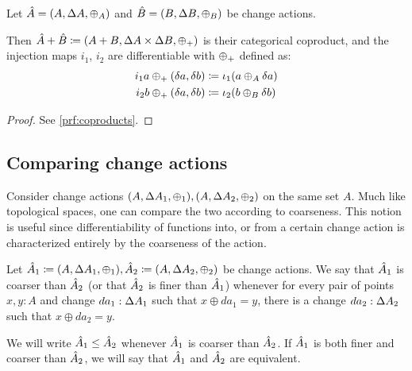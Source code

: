 \begin{prop}[name=Coproducts, restate=coproducts]
  \label{prop:coproducts}
  Let $\hat{A} = (A,\Delta A,\oplus_A)$ and $\hat{B} =
  (B,\Delta B,\oplus_B)$ be change actions.

  Then $\hat{A} + \hat{B} \coloneqq (A + B,\Delta A \times
  \Delta B,\oplus_{+})$ is their categorical coproduct, and the injection
maps $i_1$, $i_2$ are differentiable with $\oplus_{+}$ defined as:
  \begin{align*}
    i_1 a \oplus_{+} (\delta a, \delta b) &\coloneqq \iota_1 (a \oplus_A \delta a)\\
    i_2 b \oplus_{+} (\delta a, \delta b) &\coloneqq \iota_2 (b \oplus_B \delta b)
  \end{align*}
\end{prop}
\ifproofs
\begin{proof}
  See \cref{prf:coproducts}.
\end{proof}
\fi

\subsection{Comparing change actions}

Consider change actions $(A, \Delta A_1, \oplus_1), (A, \Delta A_2, \oplus_2)$ on the same
set $A$. Much like topological spaces, one can compare the two according to coarseness. This notion
is useful since differentiability of functions into, or from a certain change action is characterized
entirely by the coarseness of the action.

\begin{defn}
  Let $\hat{A}_1 \coloneqq (A, \Delta A_1, \oplus_1), \hat{A}_2 \coloneqq (A, \Delta A_2, \oplus_2)$ be 
  change actions. We say that $\hat{A}_1$ is coarser than $\hat{A}_2$ (or that $\hat{A}_2$ is finer
  than $\hat{A}_1$) whenever for every pair of points $x, y : A$ and change $da_1 : \Delta A_1$
  such that $x \oplus da_1 = y$, there is a change $da_2 : \Delta A_2$ such that $x \oplus da_2 = y$.
  
  We will write $\hat{A}_1 \leq \hat{A}_2$ whenever $\hat{A}_1$ is coarser than $\hat{A}_2$.
  If $\hat{A}_1$ is both finer and coarser than $\hat{A}_2$, we will say that $\hat{A}_1$
  and $\hat{A}_2$ are equivalent.
\end{defn}

